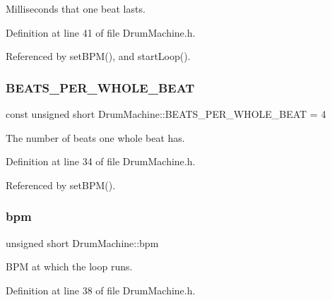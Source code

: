 Milliseconds that one beat lasts. 



Definition at line 41 of file Drum\+Machine.\+h.



Referenced by set\+B\+P\+M(), and start\+Loop().

\mbox{\label{class_drum_machine_ab4d2056f29b6eb959aa379afcc6b70f0}} 
\subsubsection{\texorpdfstring{B\+E\+A\+T\+S\+\_\+\+P\+E\+R\+\_\+\+W\+H\+O\+L\+E\+\_\+\+B\+E\+AT}{BEATS\_PER\_WHOLE\_BEAT}}
{\footnotesize\ttfamily const unsigned short Drum\+Machine\+::\+B\+E\+A\+T\+S\+\_\+\+P\+E\+R\+\_\+\+W\+H\+O\+L\+E\+\_\+\+B\+E\+AT = 4\hspace{0.3cm}{\ttfamily [private]}}



The number of beats one whole beat has. 



Definition at line 34 of file Drum\+Machine.\+h.



Referenced by set\+B\+P\+M().

\mbox{\label{class_drum_machine_afaa80be4a66f759ab590a5f67f327b67}} 
\subsubsection{\texorpdfstring{bpm}{bpm}}
{\footnotesize\ttfamily unsigned short Drum\+Machine\+::bpm\hspace{0.3cm}{\ttfamily [private]}}



B\+PM at which the loop runs. 



Definition at line 38 of file Drum\+Machine.\+h.



